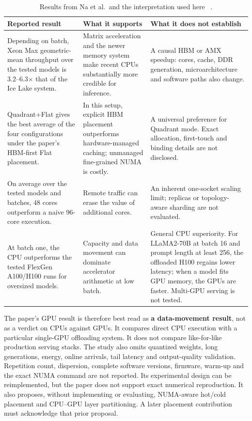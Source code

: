 \begin{table}[htbp]
\centering
\small
\tabsetup
\caption{Results from Na et al.\ and the interpretation used here
~\cite{na2024llmcpu}.}
\label{tab:na-findings}
\begin{tabularx}{\textwidth}{@{}YYY@{}}
\toprule
\headrow
\textbf{Reported result} & \textbf{What it supports}
 & \textbf{What it does not establish} \\
\midrule
Depending on batch, Xeon Max geometric-mean throughput over the tested
models is 3.2--6.3$\times$ that of the Ice Lake system.
 & Matrix acceleration and the newer memory system make recent CPUs
   substantially more credible for inference.
 & A causal HBM or AMX speedup: cores, cache, DDR generation,
   microarchitecture and software paths also change. \\
\addlinespace[2pt]
Quadrant+Flat gives the best average of the four configurations under
the paper's HBM-first Flat placement.
 & In this setup, explicit HBM placement outperforms hardware-managed
   caching; unmanaged fine-grained NUMA is costly.
 & A universal preference for Quadrant mode.  Exact allocation,
   first-touch and binding details are not disclosed. \\
\addlinespace[2pt]
On average over the tested models and batches, 48 cores outperform a
naive 96-core execution.
 & Remote traffic can erase the value of additional cores.
 & An inherent one-socket scaling limit; replicas or topology-aware
   sharding are not evaluated. \\
\addlinespace[2pt]
At batch one, the CPU outperforms the tested FlexGen A100/H100 runs for
oversized models.
 & Capacity and data movement can dominate accelerator arithmetic at
   low batch.
 & General CPU superiority.  For LLaMA2-70B at batch 16 and prompt
   length at least 256, the offloaded H100 regains lower latency; when a
   model fits GPU memory, the GPUs are faster.  Multi-GPU serving is not
   tested. \\
\bottomrule
\end{tabularx}
\end{table}

The paper's GPU result is therefore best read as \textbf{a
data-movement result}, not as a verdict on CPUs against GPUs.
It compares direct CPU execution with a particular single-GPU
offloading system.  It does not compare like-for-like production
serving stacks.  The study also omits quantized weights, long
generations, energy, online arrivals, tail latency and output-quality
validation.  Repetition count, dispersion, complete software versions,
firmware, warm-up and the exact NUMA command are not reported.  Its
experimental design can be reimplemented, but the paper does not
support exact numerical reproduction.  It also proposes, without
implementing or evaluating, NUMA-aware hot/cold placement and
CPU--GPU layer partitioning.  A later placement contribution must
acknowledge that prior proposal.

